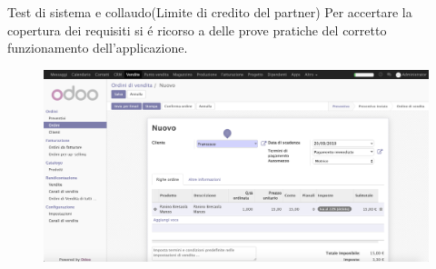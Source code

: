 \documentclass{beamer}
\begin{document}

%
%

%
%



%
%

%
%


\begin{frame}{Test di sistema e collaudo\scriptsize{(Limite di credito del partner)}}
Per accertare la copertura dei requisiti si \'e ricorso a delle prove pratiche del corretto funzionamento dell’applicazione.

\begin{figure}[H]
	\begin{center} \includegraphics[width=1\linewidth]{figures/limit_home}
	\end{center}
\end{figure}
\end{frame}
\end{document}
